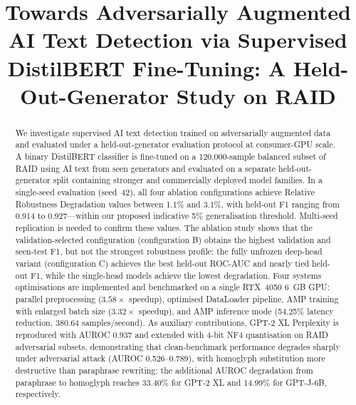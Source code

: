 \documentclass[conference]{IEEEtran}
\begin{document}
\title{Towards Adversarially Augmented AI Text Detection via Supervised
DistilBERT Fine-Tuning: A Held-Out-Generator Study on RAID}

\author{%
\and
{}
}

\maketitle

\begin{abstract}
We investigate supervised AI text detection trained on adversarially augmented data and evaluated under a held-out-generator evaluation protocol at consumer-GPU scale. A binary
DistilBERT classifier is fine-tuned on a 120,000-sample balanced subset of
RAID using AI text from seen generators and evaluated on a separate
held-out-generator split containing stronger and commercially deployed model
families. In a single-seed evaluation (seed~42), all four ablation
configurations achieve Relative Robustness Degradation values between
1.1\% and 3.1\%, with held-out F1 ranging from
0.914 to 0.927---within our proposed indicative 5\% generalisation threshold.
Multi-seed replication is needed to confirm these values. The ablation
study shows that the validation-selected configuration
(configuration B) obtains the highest validation and seen-test F1, but
not the strongest robustness profile: the fully unfrozen deep-head variant
(configuration C) achieves the best held-out ROC-AUC and nearly tied
held-out F1, while the single-head models achieve the lowest degradation.
Four systems optimisations
are implemented and benchmarked on a single RTX~4050 6~GB GPU: parallel
preprocessing ($3.58\times$ speedup), optimised DataLoader pipeline, AMP training
with enlarged batch size ($3.32\times$ speedup), and AMP inference mode (54.25\%
latency reduction, 380.64 samples/second). As auxiliary contributions,
GPT-2 XL Perplexity is reproduced with AUROC 0.937 and extended with 4-bit NF4
quantisation on RAID adversarial subsets, demonstrating that
clean-benchmark performance degrades sharply under adversarial attack
(AUROC 0.526--0.789), with homoglyph substitution more destructive than paraphrase rewriting:
the additional AUROC degradation from paraphrase to homoglyph reaches 33.40\% for GPT-2 XL
and 14.99\% for GPT-J-6B, respectively.
\end{abstract}
\end{document}

